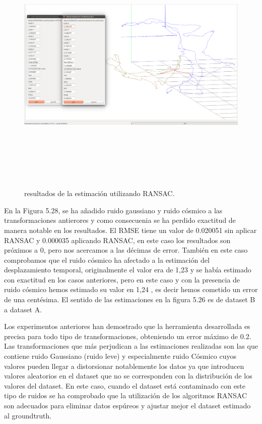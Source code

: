 \begin{figure}
\begin{center}
\label{fig:opciones de View}\includegraphics[height=12.0cm,width=18.0cm]{img/cap6/newData_EscalaTraslaRotaGaussCosmic_ba.png}
\hspace{0.5cm}

\end{center}

\caption{ resultados de la estimación  utilizando RANSAC.}
\end{figure}

En la Figura 5.28, se ha añadido ruido gaussiano y ruido cósmico a las transformaciones antierores y como consecuenia se ha perdido exactitud de manera notable en los resultados. 
El RMSE tiene un valor de 0.020051 sin aplicar RANSAC y 0.000035 aplicando RANSAC, en este caso los resultados son próximos a 0, pero nos acercamos a las décimas de error.
También en este caso comprobamos que el ruido cósmico ha afectado a la estimación del desplazamiento temporal, originalmente el valor era de 1,23 y se había estimado con exactitud en los casos anteriores, pero en este caso y con la presencia de ruido cósmico hemos estimado su valor en 1,24 , es decir hemos cometido un error de una centésima.
El sentido de las estimaciones en la figura 5.26 es de dataset B a dataset A.


Los experimentos anteriores han demostrado que la herramienta desarrollada es precisa para todo tipo de transformaciones, obteniendo un error máximo de 0.2. Las transformaciones que más perjudican a las estimaciones realizadas son las que contiene ruido Gaussiano (ruido leve) y especialmente ruido Cósmico cuyos valores pueden llegar a distorsionar notablemente los datos ya que introducen valores aleatorios en el dataset que no se corresponden con la distribución de los valores del dataset. En este caso, cuando el dataset está contaminado con este tipo de ruidos se ha comprobado que la utilización de los algoritmos RANSAC son adecuados para eliminar datos espúreos y ajustar mejor el dataset estimado al groundtruth.

